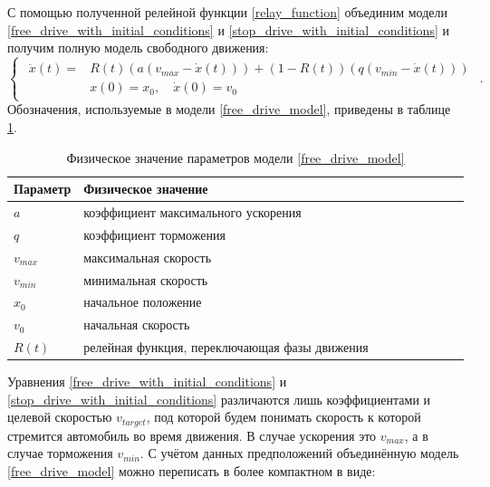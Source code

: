 \documentclass[12pt, a4paper]{extarticle}
\numberwithin{equation}{section}
\begin{document}
С помощью полученной релейной функции \eqref{relay_function} объединим модели \eqref{free_drive_with_initial_conditions} и  \eqref{stop_drive_with_initial_conditions} и получим полную модель свободного движения:
\begin{equation} \label{free_drive_model}
\begin{cases}
\begin{split}
\ddot{x}(t) = &R(t) \left( a\left(v_{max}-\dot{x}(t) \right)\right) + (1-R(t)) \left( q\left( v_{min} - \dot{x}(t)\right) \right)  \\
&x(0)=x_0, \quad \dot{x}(0)=v_{0}
\end{split}
\end{cases}.
\end{equation}
Обозначения, используемые в модели \eqref{free_drive_model}, приведены в таблице \ref{free_drive_parameters}.
\begin{table}[h!]
	\caption{Физическое значение параметров модели \eqref{free_drive_model}}
	\label{free_drive_parameters}
	\begin{center}
		\begin{tabularx}{\textwidth}{p{0.15\linewidth}p{0.85\linewidth}}			
			\hline
			\rule{0cm}{0,5cm}
			Параметр &  Физическое значение \\ 
			[3pt]\hline
			$a$ & коэффициент максимального ускорения\\
			$q$ & коэффициент торможения\\ 
			$v_{max}$ & максимальная скорость\\
			$v_{min}$ & минимальная скорость\\ 
			$x_0$ & начальное положение\\
			$v_0$ & начальная скорость\\ 
			$R(t)$ & релейная функция, переключающая фазы движения  \\ 
			\hline
		\end{tabularx}
	\end{center}
\end{table}

Уравнения \eqref{free_drive_with_initial_conditions} и  \eqref{stop_drive_with_initial_conditions} различаются лишь коэффициентами и целевой скоростью $v_{target}$, под которой будем понимать скорость к которой стремится автомобиль во время движения. В случае ускорения это $v_{max}$, а в случае торможения $v_{min}$. С учётом данных предположений объединённую модель \eqref{free_drive_model} можно переписать в более компактном в виде:
\end{document}
